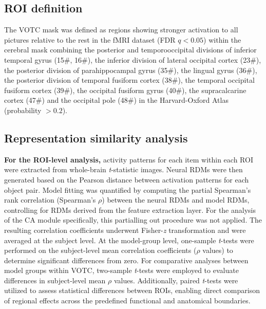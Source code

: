 \documentclass[pdflatex,sn-mathphys-num,lineno]{sn-jnl}%
\begin{document}
\begin{CJK}{UTF8}{gbsn}
\subsection{ROI definition}
The VOTC mask was defined as regions showing stronger activation to all pictures relative to the rest in the fMRI dataset (FDR $q < 0.05$) within the cerebral mask combining the posterior and temporooccipital divisions of inferior temporal gyrus (15\#, 16\#), the inferior division of lateral occipital cortex (23\#), the posterior division of parahippocampal gyrus (35\#), the lingual gyrus (36\#), the posterior division of temporal fusiform cortex (38\#), the temporal occipital fusiform cortex (39\#), the occipital fusiform gyrus (40\#), the supracalcarine cortex (47\#) and the occipital pole (48\#) in the Harvard-Oxford Atlas (probability $> 0.2$).

\subsection{Representation similarity analysis}
\textbf{For the ROI-level analysis,} activity patterns for each item within each ROI were extracted from whole-brain \textit{t}-statistic images. Neural RDMs were then generated based on the Pearson distance between activation patterns for each object pair. Model fitting was quantified by computing the partial Spearman’s rank correlation (Spearman’s $\rho$) between the neural RDMs and model RDMs, controlling for RDMs derived from the feature extraction layer. For the analysis of the CA module specifically, this partialling out procedure was not applied. The resulting correlation coefficients underwent Fisher-\textit{z} transformation and were averaged at the subject level. At the model-group level, one-sample \textit{t}-tests were performed on the subject-level mean correlation coefficients ($\rho$ values) to determine significant differences from zero. For comparative analyses between model groups within VOTC, two-sample \textit{t}-tests were employed to evaluate differences in subject-level mean $\rho$ values. Additionally, paired \textit{t}-tests were utilized to assess statistical differences between ROIs, enabling direct comparison of regional effects across the predefined functional and anatomical boundaries.


\end{CJK}
\end{document}
